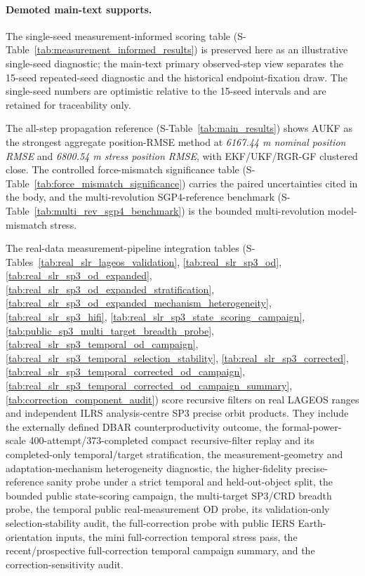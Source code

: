 \documentclass{article}
\begin{document}
\paragraph{Demoted main-text supports.}
The single-seed measurement-informed scoring table (S-Table~\ref{tab:measurement_informed_results}) is preserved here as an illustrative single-seed diagnostic; the main-text primary observed-step view separates the 15-seed repeated-seed diagnostic and the historical endpoint-fixation draw. The single-seed numbers are optimistic relative to the 15-seed intervals and are retained for traceability only.

The all-step propagation reference (S-Table~\ref{tab:main_results}) shows AUKF as the strongest aggregate position-RMSE method at \emph{6167.44 m nominal position RMSE} and \emph{6800.54 m stress position RMSE}, with EKF/UKF/RGR-GF clustered close. The controlled force-mismatch significance table (S-Table~\ref{tab:force_mismatch_significance}) carries the paired uncertainties cited in the body, and the multi-revolution SGP4-reference benchmark (S-Table~\ref{tab:multi_rev_sgp4_benchmark}) is the bounded multi-revolution model-mismatch stress.

The real-data measurement-pipeline integration tables (S-Tables~\ref{tab:real_slr_lageos_validation}, \ref{tab:real_slr_sp3_od}, \ref{tab:real_slr_sp3_od_expanded}, \ref{tab:real_slr_sp3_od_expanded_stratification}, \ref{tab:real_slr_sp3_od_expanded_mechanism_heterogeneity}, \ref{tab:real_slr_sp3_hifi}, \ref{tab:real_slr_sp3_state_scoring_campaign}, \ref{tab:public_sp3_multi_target_breadth_probe}, \ref{tab:real_slr_sp3_temporal_od_campaign}, \ref{tab:real_slr_sp3_temporal_selection_stability}, \ref{tab:real_slr_sp3_corrected}, \ref{tab:real_slr_sp3_temporal_corrected_od_campaign}, \ref{tab:real_slr_sp3_temporal_corrected_od_campaign_summary}, \ref{tab:correction_component_audit}) score recursive filters on real LAGEOS ranges and independent ILRS analysis-centre SP3 precise orbit products. They include the externally defined DBAR counterproductivity outcome, the formal-power-scale 400-attempt/373-completed compact recursive-filter replay and its completed-only temporal/target stratification, the measurement-geometry and adaptation-mechanism heterogeneity diagnostic, the higher-fidelity precise-reference sanity probe under a strict temporal and held-out-object split, the bounded public state-scoring campaign, the multi-target SP3/CRD breadth probe, the temporal public real-measurement OD probe, its validation-only selection-stability audit, the full-correction probe with public IERS Earth-orientation inputs, the mini full-correction temporal stress pass, the recent/prospective full-correction temporal campaign summary, and the correction-sensitivity audit.
\end{document}

